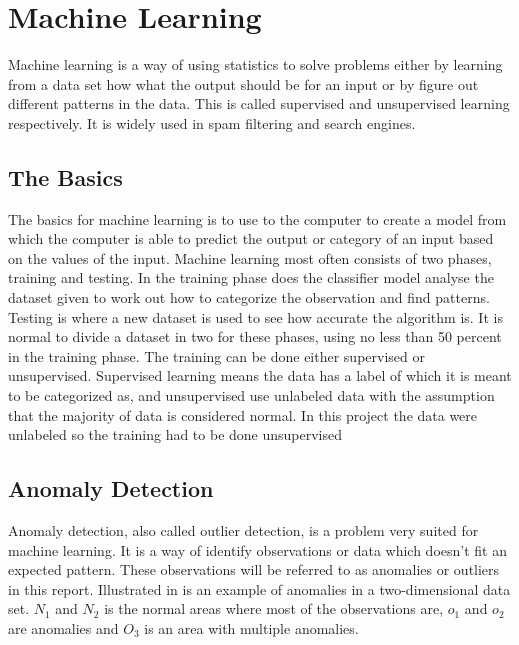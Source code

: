 \chapter{Machine Learning}
\label{chp:machine_learning}

Machine learning is a way of using statistics to solve problems either by learning from a data set how what the output should be for an input or by figure out different patterns in the data. This is called supervised and unsupervised learning respectively. It is widely used in spam filtering and search engines.

\section{The Basics}
The basics for machine learning is to use to the computer to create a model from which the computer is able to predict the output or category of an input based on the values of the input. 
Machine learning most often consists of two phases, training and testing. In the training phase does the classifier model analyse the dataset given to work out how to categorize the observation and find patterns. Testing is where a new dataset is used to see how accurate the algorithm is. It is normal to divide a dataset in two for these phases, using no less than 50 percent in the training phase.
The training can be done either supervised or unsupervised. Supervised learning means the data has a label of which it is meant to be categorized as, and unsupervised use unlabeled data with the assumption that the majority of data is considered normal. In this project the data were unlabeled so the training had to be done unsupervised

\section{Anomaly Detection}
Anomaly detection, also called outlier detection, is a problem very suited for machine learning. It is a way of identify observations or data which doesn't fit an expected pattern. These observations will be referred to as anomalies or outliers in this report. Illustrated in  is an example of anomalies in a two-dimensional data set. $N_1$ and $N_2$ is the normal areas where most of the observations are, $o_1$ and $o_2$ are anomalies and $O_3$ is an area with multiple anomalies. 

